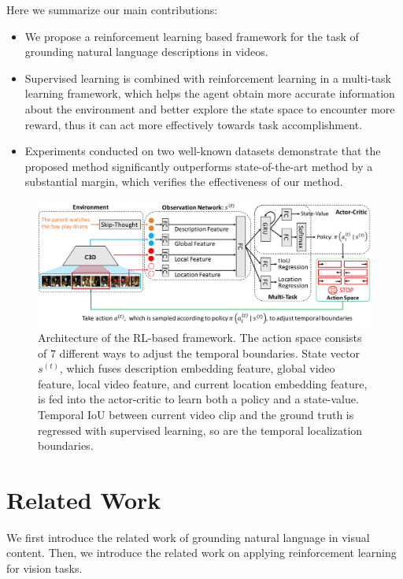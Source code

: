 \documentclass[letterpaper]{article} %
\begin{document}
Here we summarize our main contributions:
\begin{itemize}
\item We propose a reinforcement learning based framework for the task of grounding natural language descriptions in videos.
\item Supervised learning is combined with reinforcement learning in a multi-task learning framework, which helps the agent obtain more accurate information about the environment and better explore the state space to encounter more reward, thus it can act more effectively towards task accomplishment.
\item Experiments conducted on two well-known datasets demonstrate that the proposed method significantly outperforms state-of-the-art method by a substantial margin, which verifies the effectiveness of our method.
\end{itemize}

\begin{figure}[t]
\begin{center}
\includegraphics[width=\linewidth]{./overview.pdf}
\end{center}
   \caption{Architecture of the RL-based framework. The action space consists of 7 different ways to adjust the temporal boundaries. State vector $s^{(t)}$, which fuses description embedding feature, global video feature, local video feature, and current location embedding feature, is fed into the actor-critic \cite{li2017deep} to learn both a policy and a state-value. Temporal IoU between current video clip and the ground truth is regressed with supervised learning, so are the temporal localization boundaries.}
\label{fig:overview}
\end{figure}

\section{Related Work}
We first introduce the related work of grounding natural language in visual content. Then, we introduce the related work on applying reinforcement learning for vision tasks.
\end{document}
